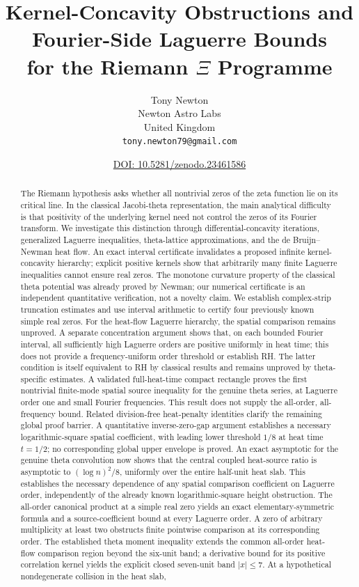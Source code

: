 \documentclass[11pt]{article}
\title{Kernel-Concavity Obstructions and Fourier-Side Laguerre Bounds\\for the Riemann $\Xi$ Programme}
\author{Tony Newton\\Newton Astro Labs\\United Kingdom\\\texttt{tony.newton79@gmail.com}}
\date{\small\href{https://doi.org/10.5281/zenodo.23461586}{DOI: 10.5281/zenodo.23461586}}
\begin{document}
\maketitle
\begin{abstract}
The Riemann hypothesis asks whether all nontrivial zeros of the
zeta function lie on its critical line. In the classical
Jacobi-theta representation, the main analytical difficulty is
that positivity of the underlying kernel need not control the
zeros of its Fourier transform. We investigate this distinction
through differential-concavity iterations, generalized Laguerre
inequalities, theta-lattice approximations, and the
de Bruijn--Newman heat flow. An exact interval certificate
invalidates a proposed infinite kernel-concavity hierarchy;
explicit positive kernels show that arbitrarily many finite
Laguerre inequalities cannot ensure real zeros. The monotone
curvature property of the classical theta potential was already
proved by Newman; our numerical certificate is an independent
quantitative verification, not a novelty claim. We establish
complex-strip truncation estimates and use interval arithmetic
to certify four previously known simple real zeros. For the heat-flow Laguerre hierarchy, the spatial comparison
remains unproved. A separate concentration argument shows
that, on each bounded Fourier interval, all sufficiently high
Laguerre orders are positive uniformly in heat time;
this does not provide a frequency-uniform order threshold
or establish RH. The latter condition
is itself equivalent to RH by classical results and remains
unproved by theta-specific estimates. A validated full-heat-time compact rectangle proves the first
nontrivial finite-mode spatial source inequality for the genuine
theta series, at Laguerre order one and small Fourier frequencies.
This result does not supply the all-order, all-frequency bound.
Related division-free heat-penalty identities clarify the
remaining global proof barrier. A quantitative inverse-zero-gap
argument establishes a necessary logarithmic-square spatial
coefficient, with leading lower threshold $1/8$ at heat time
$t=1/2$; no corresponding global upper envelope is proved.
An exact asymptotic for the genuine theta convolution now shows that the central coupled heat-source ratio is asymptotic to $(\log n)^2/8$, uniformly over the entire half-unit heat slab. This establishes the necessary dependence of any spatial comparison coefficient on Laguerre order, independently of the already known logarithmic-square height obstruction. The all-order canonical product at a simple real zero yields an exact elementary-symmetric formula and a source-coefficient bound at every Laguerre order. A zero of arbitrary multiplicity at least two obstructs finite pointwise comparison at its corresponding order. The established theta moment inequality extends the common all-order heat-flow comparison region beyond the six-unit band; a derivative bound for its positive correlation kernel yields the explicit closed seven-unit band $|x|\le7$. At a hypothetical nondegenerate collision in the heat slab,

\end{abstract}
\end{document}
